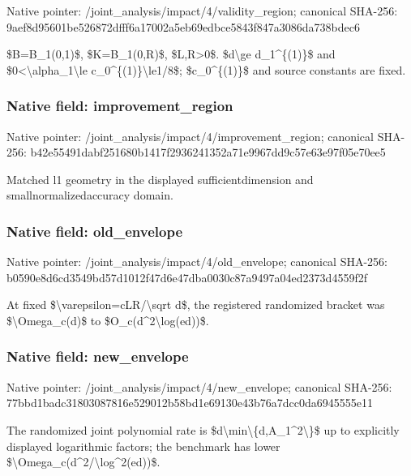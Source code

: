 \documentclass[10pt,a4paper]{article}
\begin{document}
Native pointer: /joint\_analysis/impact/4\allowbreak{}/validity\_region; canonical SHA-256: 9aef8d95601be526872dfff6\allowbreak{}a17002a5eb69edbce5843f84\allowbreak{}7a3086da738bdec6


\$B=B\_1(0,1)\$, \$K=B\_1(0,R)\$, \$L,R>0\$. \$d\textbackslash{}ge d\_1\textasciicircum{}\{(1)\}\$ and \$0<\textbackslash{}alpha\_1\textbackslash{}le c\_0\textasciicircum{}\{(1)\}\textbackslash{}le1/8\$; \$c\_0\textasciicircum{}\{(1)\}\$ and source constants are fixed.


\subsubsection{Native field: improvement\_region}


Native pointer: /joint\_analysis/impact/4\allowbreak{}/improvement\_region; canonical SHA-256: b42e55491dabf251680b1417\allowbreak{}f2936241352a71e9967dd9c5\allowbreak{}7e63e97f05e70ee5


Matched l1 geometry in the displayed sufficientdimension and smallnormalizedaccuracy domain.


\subsubsection{Native field: old\_envelope}


Native pointer: /joint\_analysis/impact/4/old\_envelope; canonical SHA-256: b0590e8d6cd3549bd57d1012\allowbreak{}f47d6e47dba0030c87a9497a\allowbreak{}04ed2373d4559f2f


At fixed \$\textbackslash{}varepsilon=cLR/\textbackslash{}sqrt d\$, the registered randomized bracket was \$\textbackslash{}Omega\_c(d)\$ to \$O\_c(d\textasciicircum{}2\textbackslash{}log(ed))\$.


\subsubsection{Native field: new\_envelope}


Native pointer: /joint\_analysis/impact/4/new\_envelope; canonical SHA-256: 77bbd1badc31803087816e52\allowbreak{}9012b58bd1e69130e43b76a7\allowbreak{}dcc0da6945555e11


The randomized joint polynomial rate is \$d\textbackslash{}min\textbackslash{}\{d,A\_1\textasciicircum{}2\textbackslash{}\}\$ up to explicitly displayed logarithmic factors; the benchmark has lower \$\textbackslash{}Omega\_c(d\textasciicircum{}2/\textbackslash{}log\textasciicircum{}2(ed))\$.
\end{document}
